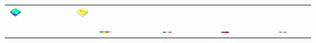 \documentclass[prodmode,acmtochi]{acmsmall} %
\begin{document}
\begin{table}
{\begin{tabular}{m{} m{} m{} m{} m{}}
\includegraphics[width=0.22\textwidth]{images/render_3d/mean_slope_4.png} &
\includegraphics[width=0.22\textwidth]{images/render_3d/mean_forms_4.png}\\
%
&
\multicolumn{1}{c}{\includegraphics[width=0.22\textwidth]{images/legends/elevation_legend_4.pdf}} &
\multicolumn{1}{c}{\includegraphics[width=0.22\textwidth]{images/legends/diff_legend_4.pdf}} &
\multicolumn{1}{c}{\includegraphics[width=0.22\textwidth]{images/legends/slope_legend.pdf}} &
\multicolumn{1}{c}{\includegraphics[width=0.22\textwidth]{images/legends/forms_legend.pdf}}\\
%
\bottomrule
\end{tabular}}
\label{table:difference_experiment} 
\end{table}

\end{document}
